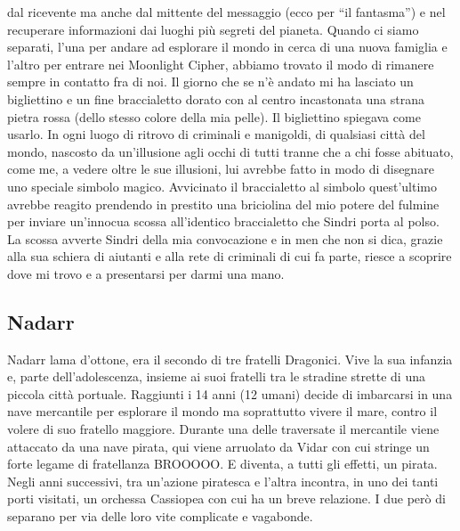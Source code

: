 \documentclass{article}
\begin{document}
dal ricevente ma anche dal mittente del messaggio (ecco per “il fantasma”) e nel recuperare informazioni dai luoghi più segreti del pianeta. Quando ci siamo separati, l’una per andare ad esplorare il mondo in cerca di una nuova famiglia e l’altro per entrare nei Moonlight Cipher, abbiamo trovato il modo di rimanere sempre in contatto fra di noi. Il giorno che se n’è andato mi ha lasciato un bigliettino e un fine braccialetto dorato con al centro incastonata una strana pietra rossa (dello stesso colore della mia pelle). Il bigliettino spiegava come usarlo. In ogni luogo di ritrovo di criminali e manigoldi, di qualsiasi città del mondo, nascosto da un’illusione agli occhi di tutti tranne che a chi fosse abituato, come me, a vedere oltre le sue illusioni, lui avrebbe fatto in modo di disegnare uno speciale simbolo magico. Avvicinato il braccialetto al simbolo quest’ultimo avrebbe reagito prendendo in prestito una briciolina del mio potere del fulmine per inviare un’innocua scossa all’identico braccialetto che Sindri porta al polso. La scossa avverte Sindri della mia convocazione e in men che non si dica, grazie alla sua schiera di aiutanti e alla rete di criminali di cui fa parte, riesce a scoprire dove mi trovo e a presentarsi per darmi una mano. 
          \subsection{Nadarr}Nadarr lama d'ottone, era il secondo di tre fratelli Dragonici. Vive la sua infanzia e, parte dell'adolescenza, insieme ai suoi fratelli tra le stradine strette di una piccola città portuale. Raggiunti i 14 anni (12 umani) decide di imbarcarsi in una nave mercantile per esplorare il mondo ma soprattutto vivere il mare, contro il volere di suo fratello maggiore. Durante una delle traversate il mercantile viene attaccato da una nave pirata, qui viene arruolato da Vidar con cui stringe un forte legame di fratellanza BROOOOO. E diventa, a tutti gli effetti, un pirata.  Negli anni successivi, tra un'azione piratesca e l'altra incontra, in uno dei tanti porti visitati, un orchessa Cassiopea con cui ha un breve relazione. I due però di separano per via delle loro vite complicate e vagabonde.
\end{document}
